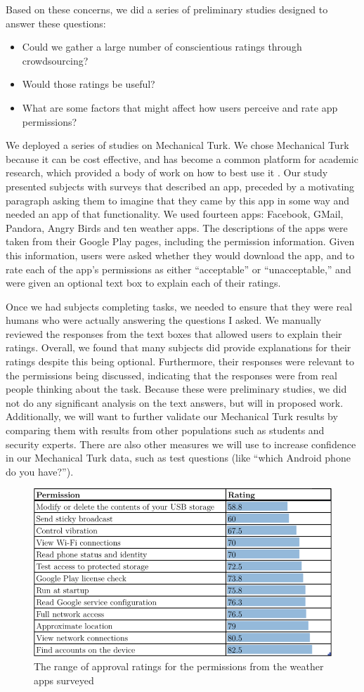 \documentclass[11pt]{article}
\begin{document}
Based on these concerns, we did a series of preliminary studies designed to answer
these questions:
\begin{itemize}
\item Could we gather a large number of conscientious ratings through crowdsourcing?
\item Would those ratings be useful?
\item What are some factors that might affect how users perceive and rate 
app permissions?
\end{itemize}
We deployed a series of studies on Mechanical Turk. We chose
Mechanical Turk because it can be cost effective, and has become
a common platform for academic research, which provided a body of work on how
to best use it \cite{reseach-mturk-BRM12, mturk-data-quality-PPS11}. 
Our study presented subjects with surveys that
described an app, preceded by a motivating paragraph asking
them to imagine that they came by this app in some way and needed an
app of that functionality.  We used fourteen apps: Facebook, GMail,
Pandora, Angry Birds and ten weather apps.  The descriptions
of the apps were taken from their Google Play pages, including the
permission information. Given this information, users were asked
whether they would download the app, and to rate each of the app's
permissions as either ``acceptable'' or ``unacceptable,'' and were
given an optional text box to explain each of their ratings.

Once we had subjects completing tasks, we needed to ensure that they 
were real humans who were actually answering the questions I
asked. We manually reviewed the responses from the text boxes
that allowed users to explain their ratings. Overall, we found that
many subjects did provide explanations for their ratings despite this being
optional. Furthermore, their responses were relevant to the
permissions being discussed, indicating that the responses were from
real people thinking about the task. Because these were preliminary
studies, we did not do any significant analysis on the text answers,
but will in proposed work. Additionally, we will want to further
validate our Mechanical Turk results by comparing them with results
from other populations such as students and security experts. 
There are also other measures we will
use to increase confidence in our Mechanical Turk data, such as test
questions (like ``which Android phone do you have?'').

\begin{figure}[t]
\centering
    \includegraphics[width=.6\linewidth]{img/RatingTable.png}
    \vspace{1pt}
    \caption{The range of approval ratings for the permissions from the 
    weather apps surveyed}
    \label{weatherratings}
\end{figure}
\end{document}
